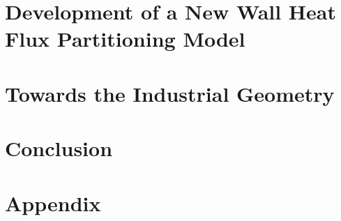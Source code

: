 


\cleardoublepage %


\part{Development of a New Wall Heat Flux Partitioning Model}













\cleardoublepage %


\part{Towards the Industrial Geometry}




\part{Conclusion} %


\cleardoublepage %




\appendix

\part{Appendix} %




